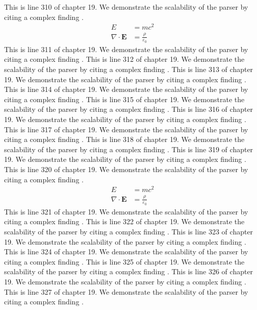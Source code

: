 This is line 310 of chapter 19. We demonstrate the scalability of the parser by citing a complex finding \cite{ref19_310}.
\begin{align*}
  E &= mc^2 \\
  \nabla \cdot \mathbf{E} &= \frac{\rho}{\varepsilon_0}
\end{align*}
This is line 311 of chapter 19. We demonstrate the scalability of the parser by citing a complex finding \cite{ref19_311}.
This is line 312 of chapter 19. We demonstrate the scalability of the parser by citing a complex finding \cite{ref19_312}.
This is line 313 of chapter 19. We demonstrate the scalability of the parser by citing a complex finding \cite{ref19_313}.
This is line 314 of chapter 19. We demonstrate the scalability of the parser by citing a complex finding \cite{ref19_314}.
This is line 315 of chapter 19. We demonstrate the scalability of the parser by citing a complex finding \cite{ref19_315}.
This is line 316 of chapter 19. We demonstrate the scalability of the parser by citing a complex finding \cite{ref19_316}.
This is line 317 of chapter 19. We demonstrate the scalability of the parser by citing a complex finding \cite{ref19_317}.
This is line 318 of chapter 19. We demonstrate the scalability of the parser by citing a complex finding \cite{ref19_318}.
This is line 319 of chapter 19. We demonstrate the scalability of the parser by citing a complex finding \cite{ref19_319}.
This is line 320 of chapter 19. We demonstrate the scalability of the parser by citing a complex finding \cite{ref19_320}.
\begin{align*}
  E &= mc^2 \\
  \nabla \cdot \mathbf{E} &= \frac{\rho}{\varepsilon_0}
\end{align*}
This is line 321 of chapter 19. We demonstrate the scalability of the parser by citing a complex finding \cite{ref19_321}.
This is line 322 of chapter 19. We demonstrate the scalability of the parser by citing a complex finding \cite{ref19_322}.
This is line 323 of chapter 19. We demonstrate the scalability of the parser by citing a complex finding \cite{ref19_323}.
This is line 324 of chapter 19. We demonstrate the scalability of the parser by citing a complex finding \cite{ref19_324}.
This is line 325 of chapter 19. We demonstrate the scalability of the parser by citing a complex finding \cite{ref19_325}.
This is line 326 of chapter 19. We demonstrate the scalability of the parser by citing a complex finding \cite{ref19_326}.
This is line 327 of chapter 19. We demonstrate the scalability of the parser by citing a complex finding \cite{ref19_327}.
